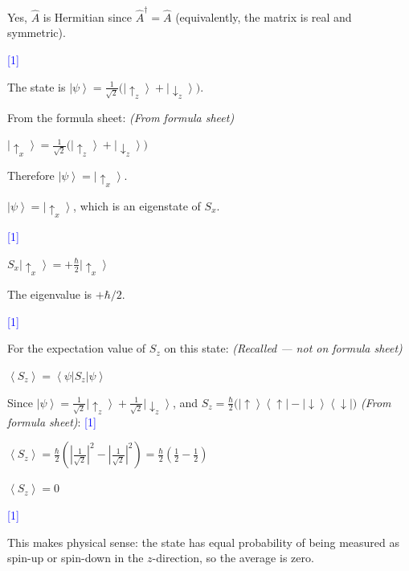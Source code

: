 \documentclass[12pt,a4paper]{article}
\newcommand{\markstep}[1]{\hfill\textcolor{blue}{[#1]}}
\newcommand{\finalanswer}[1]{%
  \begin{tcolorbox}[colback=green!5!white,colframe=green!50!black,boxrule=0.5pt]
  #1
  \end{tcolorbox}
}
\newcommand{\fromsheet}{\textit{(From formula sheet)}}
\newcommand{\recalled}{\textit{(Recalled --- not on formula sheet)}}
\renewcommand{\ket}[1]{\left|#1\right\rangle}
\renewcommand{\bra}[1]{\left\langle #1\right|}
\renewcommand{\ketbra}[2]{\left|#1\right\rangle\!\left\langle #2\right|}
\renewcommand{\expect}[1]{\left\langle #1\right\rangle}
\begin{document}
\begin{parts}
\finalanswer{Yes, $\hat{A}$ is Hermitian since $\hat{A}^\dagger = \hat{A}$ (equivalently, the matrix is real and symmetric).} \markstep{1}

\item The state is $\ket{\psi} = \frac{1}{\sqrt{2}}\bigl(\ket{\!\uparrow_z} + \ket{\!\downarrow_z}\bigr)$.

From the formula sheet: \fromsheet

$\ket{\!\uparrow_x} = \frac{1}{\sqrt{2}}\bigl(\ket{\!\uparrow_z} + \ket{\!\downarrow_z}\bigr)$

Therefore $\ket{\psi} = \ket{\!\uparrow_x}$.

\finalanswer{$\ket{\psi} = \ket{\!\uparrow_x}$, which is an eigenstate of $S_x$.} \markstep{1}

$S_x\ket{\!\uparrow_x} = +\frac{\hbar}{2}\ket{\!\uparrow_x}$

\finalanswer{The eigenvalue is $+\hbar/2$.} \markstep{1}

For the expectation value of $S_z$ on this state: \recalled

$\expect{S_z} = \bra{\psi}S_z\ket{\psi}$

Since $\ket{\psi} = \frac{1}{\sqrt{2}}\ket{\!\uparrow_z} + \frac{1}{\sqrt{2}}\ket{\!\downarrow_z}$, and $S_z = \frac{\hbar}{2}\bigl(\ketbra{\!\uparrow}{\uparrow\!} - \ketbra{\!\downarrow}{\downarrow\!}\bigr)$ \fromsheet: \markstep{1}

$\expect{S_z} = \frac{\hbar}{2}\left(\left|\frac{1}{\sqrt{2}}\right|^2 - \left|\frac{1}{\sqrt{2}}\right|^2\right) = \frac{\hbar}{2}\left(\frac{1}{2} - \frac{1}{2}\right)$

\finalanswer{$\expect{S_z} = 0$} \markstep{1}

This makes physical sense: the state has equal probability of being measured as spin-up or spin-down in the $z$-direction, so the average is zero.

\end{parts}
\end{document}
